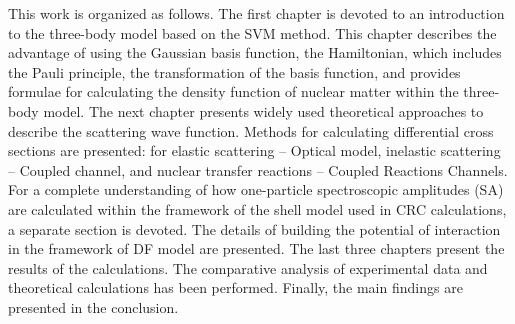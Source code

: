 \documentclass[
12pt, %
oneside, %
english, %
doublespacing, %
doublespacing, %
toctotoc, %
parskip, %
headsepline, %
]{MastersDoctoralThesis} %
\newcommand{\he}{\textsuperscript{6}He\xspace}
\newcommand{\li}{\textsuperscript{6}Li\xspace}
\newcommand{\be}{\textsuperscript{9}Be\xspace}
\begin{document}
This work is organized as follows. The first chapter is devoted to an introduction to the three-body model based on the SVM method. This chapter describes the advantage of using the Gaussian basis function, the Hamiltonian, which includes the Pauli principle, the transformation of the basis function, and provides formulae for calculating the density function of nuclear matter within the three-body model. 
The next chapter presents widely used theoretical approaches to describe the scattering wave function. 
Methods for calculating differential cross sections  are presented: for elastic scattering -- Optical model, inelastic scattering -- Coupled channel, and nuclear transfer reactions -- Coupled Reactions Channels. 
For a complete understanding of how one-particle spectroscopic amplitudes (SA) are calculated within the framework of the shell model used in CRC calculations, a separate section is devoted.
The details of building the potential of interaction in the framework of DF model are presented.
The last three chapters present the results of the calculations. 
The comparative analysis of experimental data and theoretical calculations has been performed.
Finally,  the main findings are presented in the conclusion.
\end{document}
